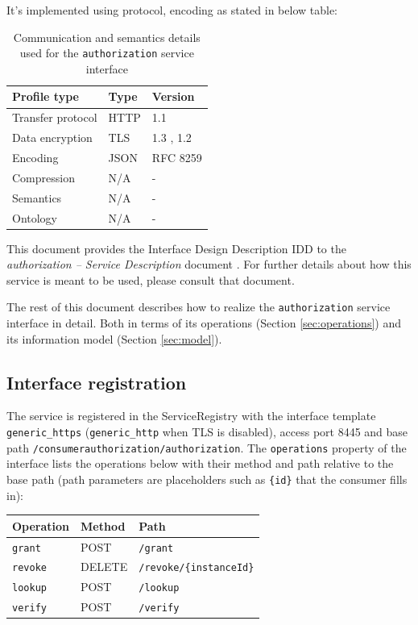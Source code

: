 \documentclass[a4paper]{arrowhead}
\begin{document}
It's implemented using protocol, encoding as stated in below table:
\begin{table}[ht!]
  \centering
  \begin{tabular}{|l|l|l|}
    \hline
    \rowcolor{gray!33} Profile type & Type & Version \\ \hline
    Transfer protocol & HTTP & 1.1 \cite{rfc9112} \\ \hline
    Data encryption & TLS & 1.3 \cite{rfc8446}, 1.2 \cite{rfc5246} \\ \hline
    Encoding & JSON & RFC 8259 \cite{rfc8259} \\ \hline
    Compression & N/A & - \\ \hline
    Semantics & N/A & - \\ \hline
    Ontology & N/A & - \\ \hline
  \end{tabular}
  \caption{Communication and semantics details used for the \texttt{authorization} service interface}
  \label{tab:comunication_semantics_profile}
\end{table}

This document provides the Interface Design Description IDD to the \textit{authorization -- Service Description} document \cite{ca-authorization-sd}.
For further details about how this service is meant to be used, please consult that document.

The rest of this document describes how to realize the \texttt{authorization} service
interface in detail. Both in terms of its operations (Section \ref{sec:operations}) and its information model (Section \ref{sec:model}).

\subsection{Interface registration}

The service is registered in the ServiceRegistry with the interface template \texttt{generic\_\allowbreak{}https} (\texttt{generic\_\allowbreak{}http} when TLS is disabled), access port 8445 and base path \texttt{/\allowbreak{}consumerauthorization/\allowbreak{}authorization}. The \texttt{operations} property of the interface lists the operations below with their method and path relative to the base path (path parameters are placeholders such as \texttt{\{id\}} that the consumer fills in):

\noindent\begin{longtable}{| p{5.2cm} | p{1.6cm} | p{8.4cm} |} \hline
\rowcolor{gray!33} Operation & Method & Path \\ \hline \endhead
\texttt{grant} & POST & \texttt{/\allowbreak{}grant} \\ \hline
\texttt{revoke} & DELETE & \texttt{/\allowbreak{}revoke/\allowbreak{}\{instance\allowbreak{}Id\}} \\ \hline
\texttt{lookup} & POST & \texttt{/\allowbreak{}lookup} \\ \hline
\texttt{verify} & POST & \texttt{/\allowbreak{}verify} \\ \hline
\end{longtable}
\end{document}
